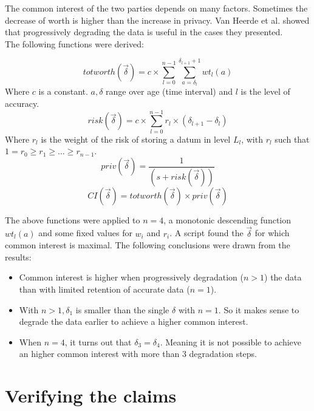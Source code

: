 \documentclass[a4paper,12pt,oneside,fleqn]{article}
\begin{document}
The common interest of the two parties depends on many
factors. Sometimes the decrease of worth is higher than the increase
in privacy. Van Heerde et al. showed that progressively degrading the
data is useful in the cases they presented.\\

The following functions were derived:

\[
    totworth(\vec\delta) = c \times \sum_{l=0}^{n-1}
    \sum_{a=\delta_l}^{\delta_{l+1} + 1} wt_l(a)
\]
Where $c$ is a constant. $a,\delta$ range over age (time interval) and
$l$ is the level of accuracy.
\[
    risk(\vec\delta) = c \times \sum_{l=0}^{n-1} r_l \times
    (\delta_{l+1} - \delta_l)
\]
Where $r_l$ is the weight of the risk of storing a datum in level
$L_l$, with $r_l$ such that $1 = r_0 \geq r_1 \geq \ldots \geq
r_{n-1}$.
\[
    priv(\vec\delta) = \frac{1}{(s + risk(\vec\delta))}
\]
\[
    CI(\vec\delta) = totworth(\vec\delta) \times priv(\vec\delta)
\]

The above functions were applied to $n = 4$, a monotonic descending
function $wt_l(a)$ and some fixed values for $w_i$ and $r_i$. A script
found the $\vec\delta$ for which common interest is maximal.  The
following conclusions were drawn from the results:

\begin{itemize}
    \item Common interest is higher when progressively degradation ($n
      > 1$) the data than with limited retention of accurate data
      ($n=1$).

    \item With $n > 1, \delta_1$ is smaller than the single $\delta$
      with $n =1$. So it makes sense to degrade the data earlier to
      achieve a higher common interest.

    \item When $n = 4$, it turns out that $\delta_3 =
      \delta_4$. Meaning it is not possible to achieve an higher
      common interest with more than 3 degradation steps.
\end{itemize}

\section{Verifying the claims}

\end{document}
